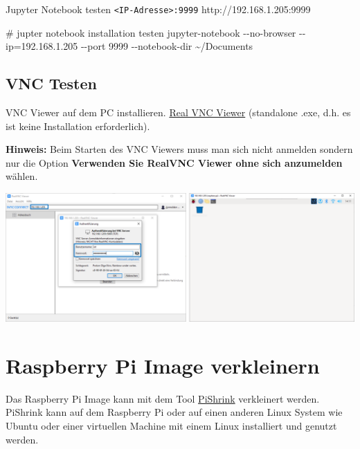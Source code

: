 \documentclass[
  11pt,
  a4paperpaper,
  oneside, openany  ,captions=tableheading
]{scrbook}
\newenvironment{Shaded}{\begin{snugshade}}{\end{snugshade}}
\newcommand{\AttributeTok}[1]{\textcolor[rgb]{0.40,0.45,0.13}{#1}}
\newcommand{\CommentTok}[1]{\textcolor[rgb]{0.37,0.37,0.37}{#1}}
\newcommand{\ExtensionTok}[1]{\textcolor[rgb]{0.00,0.23,0.31}{#1}}
\newcommand{\NormalTok}[1]{\textcolor[rgb]{0.00,0.23,0.31}{#1}}
\newcommand{\OperatorTok}[1]{\textcolor[rgb]{0.37,0.37,0.37}{#1}}
\theoremstyle{definition}
\theoremstyle{remark}
\begin{document}
Jupyter Notebook testen
\texttt{\textless{}IP-Adresse\textgreater{}:9999}
http://192.168.1.205:9999

\begin{Shaded}
\begin{Highlighting}[]
\CommentTok{\# jupter notebook installation testen}
\ExtensionTok{jupyter{-}notebook} \AttributeTok{{-}{-}no{-}browser} \AttributeTok{{-}{-}ip}\OperatorTok{=}\NormalTok{192.168.1.205 }\AttributeTok{{-}{-}port}\NormalTok{ 9999 }\AttributeTok{{-}{-}notebook{-}dir}\NormalTok{ \textasciitilde{}/Documents}
\end{Highlighting}
\end{Shaded}

\subsection{VNC Testen}\label{vnc-testen}

VNC Viewer auf dem PC installieren.
\href{https://www.realvnc.com/en/connect/download/viewer}{Real VNC
Viewer} (standalone .exe, d.h. es ist keine Installation erforderlich).

\textbf{Hinweis:} Beim Starten des VNC Viewers muss man sich nicht
anmelden sondern nur die Option \textbf{Verwenden Sie RealVNC Viewer
ohne sich anzumelden} wählen.

\includegraphics{images/raspberrypi_realvnc.png}

\section{Raspberry Pi Image
verkleinern}\label{raspberry-pi-image-verkleinern}

Das Raspberry Pi Image kann mit dem Tool
\href{https://github.com/Drewsif/PiShrink}{PiShrink} verkleinert werden.
PiShrink kann auf dem Raspberry Pi oder auf einen anderen Linux System
wie Ubuntu oder einer virtuellen Machine mit einem Linux installiert und
genutzt werden.
\end{document}
